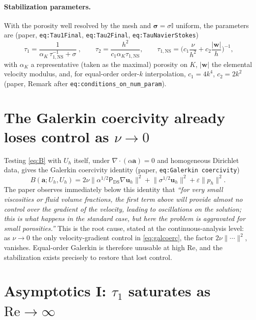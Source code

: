\documentclass[11pt]{article}
\newcommand{\buh}{\boldsymbol{u}_h}
\newcommand{\bw}{\boldsymbol{w}}
\newcommand{\ba}{\boldsymbol{a}}
\newcommand{\bsig}{\boldsymbol{\sigma}}
\newcommand{\DSPi}{\mathsf{P}_{\mathrm{DS}}}  %
\newcommand{\tauNS}{\tau_{1,\mathrm{NS}}}
\newcommand{\Reyn}{\mathrm{Re}}
\newcommand{\grad}{\nabla}
\newcommand{\divg}{\nabla\!\cdot\!}
\begin{document}
\paragraph{Stabilization parameters.}
With the porosity well resolved by the mesh and $\bsig=\sigma\mathbb I$ uniform,
the parameters are (paper, \texttt{eq:Tau1Final}, \texttt{eq:Tau2Final},
\texttt{eq:TauNavierStokes})
\begin{equation}
  \boxed{\;\tau_1=\frac{1}{\alpha_K\,\tauNS^{-1}+\sigma}\;},
  \qquad
  \tau_2=\frac{h^2}{c_1\alpha_K\tauNS},
  \qquad
  \tauNS=\Big(c_1\frac{\nu}{h^2}+c_2\frac{|\bw|}{h}\Big)^{-1},
  \label{eq:tau}
\end{equation}
with $\alpha_K$ a representative (taken as the maximal) porosity on $K$, $|\bw|$
the elemental velocity modulus, and, for equal-order order-$k$ interpolation,
$c_1=4k^4$, $c_2=2k^2$ (paper, Remark after \texttt{eq:conditions\_on\_num\_param}).

\section{The Galerkin coercivity already loses control as $\nu\to0$}\label{sec:galcoerc}

Testing \eqref{eq:B} with $U_h$ itself, under $\divg(\alpha\ba)=0$ and homogeneous
Dirichlet data, gives the Galerkin coercivity identity (paper, \texttt{eq:Galerkin
coercivity})
\begin{equation}
  B(\ba;U_h,U_h)=2\nu\big\|\alpha^{1/2}\DSPi\grad\buh\big\|^2
  +\big\|\sigma^{1/2}\buh\big\|^2+\varepsilon\|p_h\|^2 .
  \label{eq:galcoerc}
\end{equation}
The paper observes immediately below this identity that \emph{``for very small
viscosities or fluid volume fractions, the first term above will provide almost no
control over the gradient of the velocity, leading to oscillations on the
solution; this is what happens in the standard case, but here the problem is
aggravated for small porosities.''} This is the root cause, stated at the
continuous-analysis level: as $\nu\to0$ the only velocity-gradient control in
\eqref{eq:galcoerc}, the factor $2\nu\|\cdots\|^2$, vanishes. Equal-order Galerkin
is therefore unusable at high $\Reyn$, and the stabilization exists precisely to
restore that lost control.

\section{Asymptotics I: $\tau_1$ saturates as $\Reyn\to\infty$}\label{sec:tausat}
\end{document}

